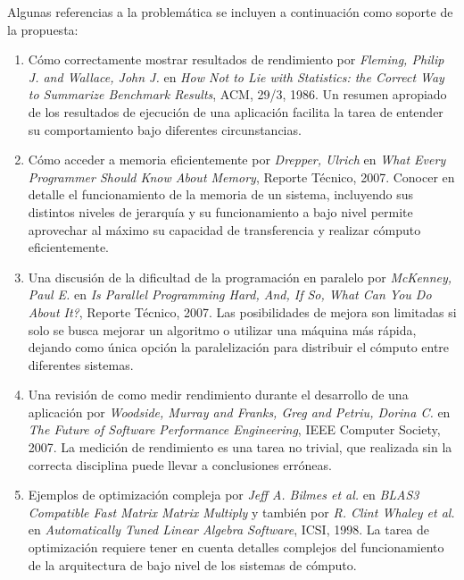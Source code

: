 \documentclass[a4paper]{article}
\begin{document}
\bigskip

Algunas referencias a la problemática se incluyen a continuación como soporte de la propuesta:

\begin{enumerate}

\item Cómo correctamente mostrar resultados de rendimiento por {\it Fleming, Philip J. and Wallace, John J.} en {\it How Not to Lie with Statistics: the Correct Way to Summarize Benchmark Results}, {ACM}, {29/3}, {1986}. Un resumen apropiado de los resultados de ejecución de una aplicación facilita la tarea de entender su comportamiento bajo diferentes circunstancias.

\item Cómo acceder a memoria eficientemente por {\it Drepper, Ulrich} en {\it What Every Programmer Should Know About Memory}, Reporte Técnico, 2007. Conocer en detalle el funcionamiento de la memoria de un sistema, incluyendo sus distintos niveles de jerarquía y su funcionamiento a bajo nivel permite aprovechar al máximo su capacidad de transferencia y realizar cómputo eficientemente.

\item Una discusión de la dificultad de la programación en paralelo por {\it McKenney, Paul E.} en {\it Is Parallel Programming Hard, And, If So, What Can You Do About It?}, Reporte Técnico, 2007. Las posibilidades de mejora son limitadas si solo se busca mejorar un algoritmo o utilizar una máquina más rápida, dejando como única opción la paralelización para distribuir el cómputo entre diferentes sistemas.

\item Una revisión de como medir rendimiento durante el desarrollo de una aplicación por {\it Woodside, Murray and Franks, Greg and Petriu, Dorina C.} en {\it The Future of Software Performance Engineering}, IEEE Computer Society, 2007. La medición de rendimiento es una tarea no trivial, que realizada sin la correcta disciplina puede llevar a conclusiones erróneas.

\item Ejemplos de optimización compleja por {\it Jeff A. Bilmes et al.} en {\it BLAS3 Compatible Fast Matrix Matrix Multiply} y también por {\it R. Clint Whaley et al.} en {\it Automatically Tuned Linear Algebra Software}, ICSI, 1998. La tarea de optimización requiere tener en cuenta detalles complejos del funcionamiento de la arquitectura de bajo nivel de los sistemas de cómputo.


\end{enumerate}
\end{document}

